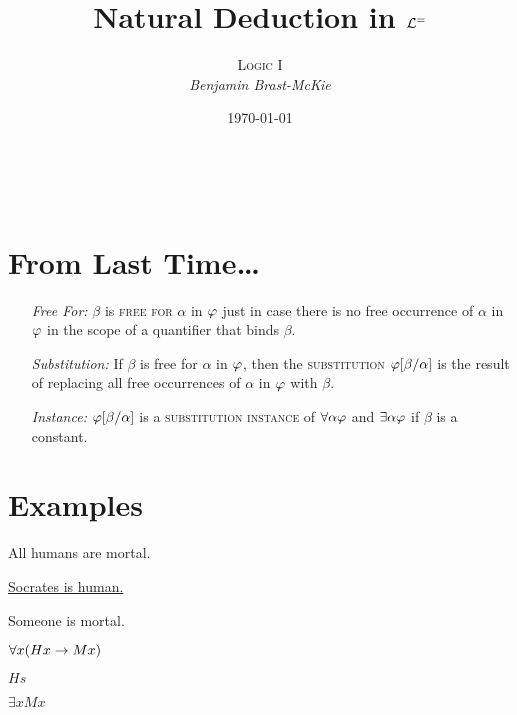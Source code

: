 \documentclass[a4paper, 11pt]{article} %
\title{\textbf{Natural Deduction in $\mathcal{L}^=$}} %
\author{\textsc{Logic I}\\ \em Benjamin Brast-McKie} %
\date{\today} %
\makeatletter
\renewcommand{\maketitle}{
\begin{flushright}
{\LARGE\@title}

\vspace{10pt}

{\@author}
\\ \@date
\end{flushright}

\vspace{-20pt}

}
\makeatother
\begin{document}
\maketitle %

\thispagestyle{empty}


\section*{From Last Time\ldots}

\begin{enumerate}
  \item[\it Free For:] $\beta$ is \textsc{free for} $\alpha$ in $\varphi$ just in case there is no free occurrence of $\alpha$ in $\varphi$ in the scope of a quantifier that binds $\beta$. 
  \item[\it Substitution:] If $\beta$ is free for $\alpha$ in $\varphi$, then the \textsc{substitution} $\varphi[\beta/\alpha]$ is the result of replacing all free occurrences of $\alpha$ in $\varphi$ with $\beta$. 
  \item[\it Instance:] $\varphi[\beta/\alpha]$ is a \textsc{substitution instance} of $\forall \alpha\varphi$ and $\exists \alpha\varphi$ if $\beta$ is a constant. 
\end{enumerate}
   

  
\section*{Examples}%
  \label{sec:Examples}

\begin{enumerate}
  \begin{multicols}{2}
    \item All humans are mortal.
    \item \underline{Socrates is human.\quad\quad}
    \item Someone is mortal.

    \setcounter{enumi}{0}
    \item $\forall x(Hx \rightarrow Mx)$
    \item \underline{$Hs$\quad\quad} 
    \item $\exists xMx$ 
  \end{multicols}
\end{enumerate}
\end{document}
